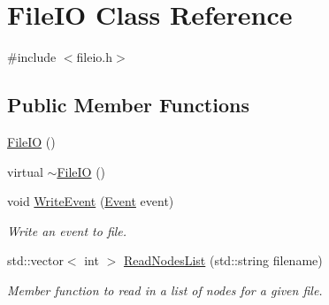 \hypertarget{classFileIO}{\section{\-File\-I\-O \-Class \-Reference}
\label{classFileIO}
}


{\ttfamily \#include $<$fileio.\-h$>$}

\subsection*{\-Public \-Member \-Functions}
\begin{DoxyCompactItemize}
\item 
\hyperlink{classFileIO_a8b0d602c3461181e12c05f655dea5018}{\-File\-I\-O} ()
\item 
virtual \hyperlink{classFileIO_adc3caa8f1e5d76274d8ffb8b5c17288b}{$\sim$\-File\-I\-O} ()
\item 
void \hyperlink{classFileIO_a803187b0a9017bc3e1a82bf8df9789ff}{\-Write\-Event} (\hyperlink{classEvent}{\-Event} event)
\begin{DoxyCompactList}\small\item\em \-Write an event to file. \end{DoxyCompactList}\item 
std\-::vector$<$ int $>$ \hyperlink{classFileIO_a03dab3111ed64ec52cbeb80c43e86fbe}{\-Read\-Nodes\-List} (std\-::string filename)
\begin{DoxyCompactList}\small\item\em \-Member function to read in a list of nodes for a given file. \end{DoxyCompactList}\end{DoxyCompactItemize}
